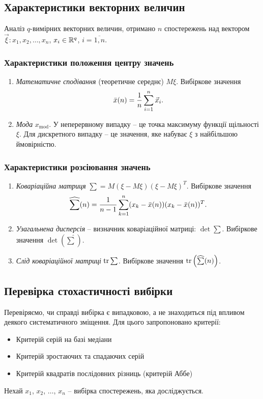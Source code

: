 \subsection{Характеристики векторних величин}
Аналіз $q$-вимірних векторних величин, отримано $n$ спостережень над вектором $\vec\xi: x_1, x_2, \ldots, x_n$, $x_i \in \mathbb{R}^q$, $i = \overline{1,n}$.
\subsubsection{Характеристики положення центру значень}
\begin{enumerate}
	\item \textit{Математичне сподівання} (теоретичне середнє) $M\xi$. Вибіркове значення \[\bar{x}(n) = \dfrac{1}{n} \displaystyle\sum\limits_{i=1}^n \vec{x}_i.\]
	\item \textit{Мода} $x_{\text{mod}}$. У неперервному випадку -- це точка максимуму функції щільності $\xi$. Для дискретного випадку -- це значення, яке набуває $\xi$ з найбільшою ймовірністю.
\end{enumerate}
\subsubsection{Характеристики розсіювання значень}
\begin{enumerate} 
	\item \textit{Коваріаційна матриця} $\sum = M(\xi - M\xi)(\xi - M\xi)^T$. Вибіркове значення \[\widehat{\sum}(n) = \dfrac{1}{n-1} \displaystyle\sum\limits_{k=1}^n (x_k - \bar x(n))(x_k - \bar x(n))^T.\]
	\item \textit{Узагальнена дисперсія} -- визначник коваріаційної матриці: $\det \sum$. Вибіркове значення $\det\left(\widehat{\sum}\right)$.
	\item \textit{Слід коваріаційної матриці} $\operatorname{tr}\sum$. Вибіркове значення $\operatorname{tr}\left(\widehat{\sum}(n)\right)$.
\end{enumerate}
\subsection{Перевірка стохастичності вибірки}
Перевіряємо, чи справді вибірка є випадковою, а не знаходиться під впливом деякого систематичного зміщення. Для цього запропоновано критерії:
\begin{itemize}
	\item Критерій серій на базі медіани
	\item Критерій зростаючих та спадаючих серій
	\item Критерій квадратів послідовних різниць (критерій Аббе)
\end{itemize}
Нехай $x_1$, $x_2$, $\ldots$, $x_n$ -- вибірка спостережень, яка досліджується. \\

